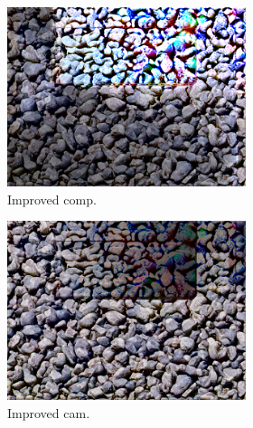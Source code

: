 \begin{figure}[]
\begin{subfigure}{\textwidth}
        \begin{subfigure}{0.24\textwidth}
            \centering
            \includegraphics[width=\textwidth]{images/04-experiment02/carpet/pebbles/improved_im.jpg}
            \caption*{Improved comp.}
        \end{subfigure}
        \hfill
        \begin{subfigure}{0.24\textwidth}
            \centering
            \includegraphics[width=\textwidth]{images/04-experiment02/carpet/pebbles/improved_proj.jpg}
            \caption*{Improved cam.}
        \end{subfigure}
        \hfill
        \begin{subfigure}{0.24\textwidth}
            \centering

\end{subfigure}
\end{subfigure}
\end{figure}
